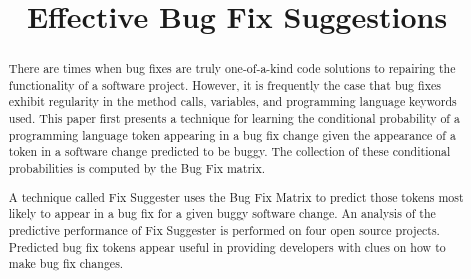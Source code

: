 \documentclass[conference]{IEEEtran}
\begin{document}
\title{Effective Bug Fix Suggestions}

\author{
}
% 
		
\maketitle

\begin{abstract}

There are times when bug fixes are truly one-of-a-kind code solutions to repairing the functionality of a software project. However, it is frequently the case that bug fixes exhibit regularity in the method calls, variables, and programming language keywords used. This paper first presents a technique for learning the conditional probability of a programming language token appearing in a bug fix change given the appearance of a token in a software change predicted to be buggy. The collection of these conditional probabilities is computed by the Bug Fix matrix.

A technique called Fix Suggester uses the Bug Fix Matrix to predict those tokens most likely to appear in a bug fix for a given buggy software change. An analysis of the predictive performance of Fix Suggester is performed on four open source projects. Predicted bug fix tokens appear useful in providing developers with clues on how to make bug fix changes.

\end{abstract}
\end{document}
